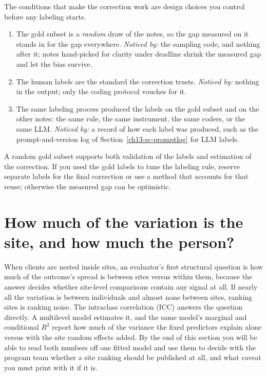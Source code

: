 The conditions that make the correction work are design choices you control before any labeling starts.

\begin{restson}
\begin{enumerate}
\item The gold subset is a \emph{random} draw of the notes, so the gap measured on it stands in for the gap everywhere. \emph{Noticed by:} the sampling code, and nothing after it; notes hand-picked for clarity under deadline shrink the measured gap and let the bias survive.
\item The human labels are the standard the correction trusts. \emph{Noticed by:} nothing in the output; only the coding protocol vouches for it.
\item The same labeling process produced the labels on the gold subset and on the other notes: the same rule, the same instrument, the same coders, or the same LLM. \emph{Noticed by:} a record of how each label was produced, such as the prompt-and-version log of Section~\ref{ch13-sc-promptlog} for LLM labels.
\end{enumerate}
\end{restson}

A random gold subset supports both validation of the labels and estimation of the correction. If you used the gold labels to tune the labeling rule, reserve separate labels for the final correction or use a method that accounts for that reuse; otherwise the measured gap can be optimistic.

\section{How much of the variation is the site, and how much the person?}\label{sec:icc}
When clients are nested inside sites, an evaluator's first structural question is how much of the outcome's spread is between sites versus within them, because the answer decides whether site-level comparisons contain any signal at all. If nearly all the variation is between individuals and almost none between sites, ranking sites is ranking noise. The intraclass correlation (ICC) answers the question directly. A multilevel model estimates it, and the same model's marginal and conditional $R^2$ \parencite{nakagawa2013general} report how much of the variance the fixed predictors explain alone versus with the site random effects added. By the end of this section you will be able to read both numbers off one fitted model and use them to decide with the program team whether a site ranking should be published at all, and what caveat you must print with it if it is.

